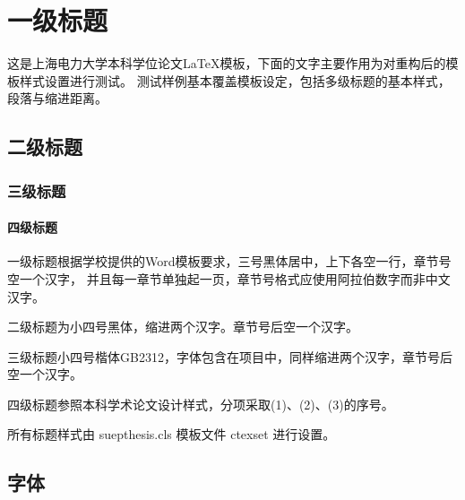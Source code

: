 %
%
%
%
%

\chapter{一级标题}

这是上海电力大学本科学位论文\LaTeX{}模板，下面的文字主要作用为对重构后的模板样式设置进行测试。
测试样例基本覆盖模板设定，包括多级标题的基本样式，段落与缩进距离。

\section{二级标题}

\subsection{三级标题}

\subsubsection{四级标题}

一级标题根据学校提供的Word模板要求，三号黑体居中，上下各空一行，章节号空一个汉字，
并且每一章节单独起一页，章节号格式应使用阿拉伯数字而非中文汉字。

二级标题为小四号黑体，缩进两个汉字。章节号后空一个汉字。

三级标题小四号楷体GB2312，字体包含在项目中，同样缩进两个汉字，章节号后空一个汉字。

四级标题参照本科学术论文设计样式，分项采取(1)、(2)、(3)的序号。

所有标题样式由 suepthesis.cls 模板文件 ctexset 进行设置。

\section{字体}

